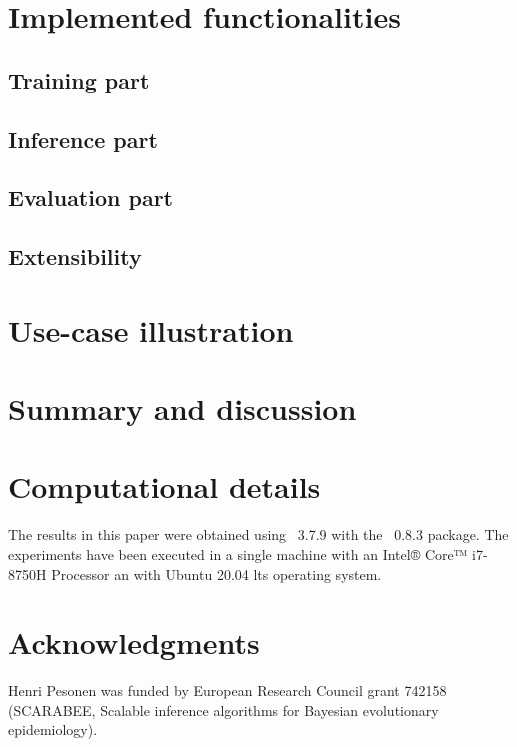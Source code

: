 \documentclass[article]{jss}
\begin{document}
\section{Implemented functionalities}


\subsection{Training part}
\label{subsec:training}


\subsection{Inference part}
\label{subsec:inference}


\subsection{Evaluation part}
\label{subsec:evaluation}


\subsection{Extensibility} %
\label{subsec:extensibility}


\section{Use-case illustration}


\section{Summary and discussion} \label{sec:summary}



\section*{Computational details}

The results in this paper were obtained using ~3.7.9
with the ~0.8.3 package. The experiments have been executed
in a single machine with an Intel® Core™ i7-8750H Processor an with
Ubuntu 20.04 lts operating system.

\section*{Acknowledgments}

Henri Pesonen was funded by European Research Council grant 742158 (SCARABEE,
Scalable inference algorithms for Bayesian evolutionary epidemiology).

\clearpage


\end{document}

